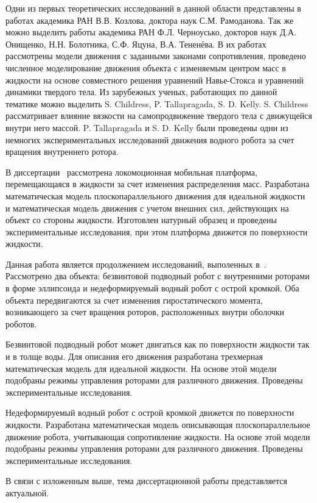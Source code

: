 Одни из первых теоретических исследований в данной области представлены в работах академика РАН В.В. Козлова, доктора наук С.М. Рамоданова. Так же можно выделить работы академика РАН Ф.Л. Черноусько, докторов наук Д.А. Онищенко, Н.Н. Болотника, С.Ф. Яцуна, В.А. Тененёва. В их работах рассмотрены модели движения с заданными законами сопротивления, проведено численное моделирование движения объекта с изменяемым центром масс в жидкости на основе совместного решения уравнений Навье-Стокса и уравнений динамики твердого тела. Из зарубежных ученых, работающих по данной тематике можно выделить S. Childress, P. Tallapragada, S. D. Kelly. S. Childress рассматривает влияние вязкости на самопродвижение твердого тела с движущейся внутри него массой. P. Tallapragada и S. D. Kelly были проведены одни из немногих экспериментальных исследований движения водного робота за счет вращения внутреннего ротора.

В диссертации~\cite{Klenov_diss} рассмотрена локомоционная мобильная платформа, перемещающаяся в жидкости за счет изменения распределения масс. Разработана математическая модель плоскопараллельного движения для идеальной жидкости и математическая модель движения с учетом внешних сил, действующих на объект со стороны жидкости. Изготовлен натурный образец и проведены экспериментальные исследования, при этом платформа движется по поверхности жидкости.

Данная работа является продолжением исследований, выполенных в~\cite{Klenov_diss}. Рассмотрено два объекта: безвинтовой подводный робот с внутренними роторами в форме эллипсоида и недеформируемый водный робот с острой кромкой. Оба объекта передвигаются за счет изменения гиростатического момента, возникающего за счет вращения роторов, расположенных внутри оболочки роботов.
 
Безвинтовой подводный робот может двигаться как по поверхности жидкости так и в толще воды. Для описания его движения разработана трехмерная математическая модель для идеальной жидкости. На основе этой модели подобраны режимы управления роторами для различного движения. Проведены экспериментальные исследования.

Недеформируемый водный робот с острой кромкой движется по поверхности жидкости. Разработана математическая модель описывающая плоскопараллельное движение робота, учитывающая сопротивление жидкости. На основе этой модели подобраны режимы управления роторами для различного движения. Проведены экспериментальные исследования.


В связи с изложенным выше, тема диссертационной работы представляется актуальной.



